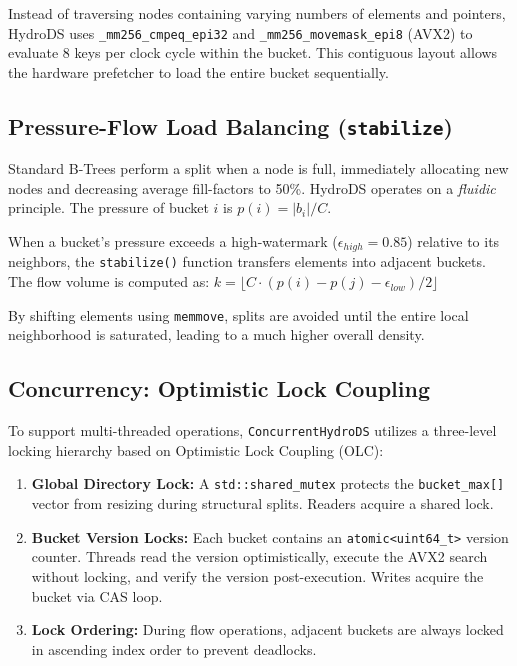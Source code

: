 \documentclass[sigconf]{acmart}
\begin{document}
Instead of traversing nodes containing varying numbers of elements and pointers, HydroDS uses \texttt{\_mm256\_cmpeq\_epi32} and \texttt{\_mm256\_movemask\_epi8} (AVX2) to evaluate 8 keys per clock cycle within the bucket. This contiguous layout allows the hardware prefetcher to load the entire bucket sequentially.

\subsection{Pressure-Flow Load Balancing (\texttt{stabilize})}
Standard B-Trees perform a split when a node is full, immediately allocating new nodes and decreasing average fill-factors to 50\%. HydroDS operates on a \textit{fluidic} principle. The pressure of bucket $i$ is $p(i) = |b_i| / C$. 

When a bucket's pressure exceeds a high-watermark ($\epsilon_{high} = 0.85$) relative to its neighbors, the \texttt{stabilize()} function transfers elements into adjacent buckets. 
The flow volume is computed as:
$k = \lfloor C \cdot (p(i) - p(j) - \epsilon_{low}) / 2 \rfloor$

By shifting elements using \texttt{memmove}, splits are avoided until the entire local neighborhood is saturated, leading to a much higher overall density.

\subsection{Concurrency: Optimistic Lock Coupling}
To support multi-threaded operations, \texttt{ConcurrentHydroDS} utilizes a three-level locking hierarchy based on Optimistic Lock Coupling (OLC):
\begin{enumerate}
    \item \textbf{Global Directory Lock:} A \texttt{std::shared\_mutex} protects the \texttt{bucket\_max[]} vector from resizing during structural splits. Readers acquire a shared lock.
    \item \textbf{Bucket Version Locks:} Each bucket contains an \texttt{atomic<uint64\_t>} version counter. Threads read the version optimistically, execute the AVX2 search without locking, and verify the version post-execution. Writes acquire the bucket via CAS loop.
    \item \textbf{Lock Ordering:} During flow operations, adjacent buckets are always locked in ascending index order to prevent deadlocks.
\end{enumerate}
\end{document}

